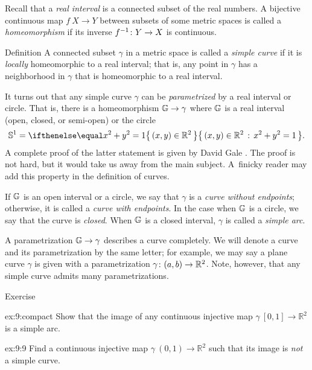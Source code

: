 Recall that a \emph{real interval} is a connected subset of the real numbers.
A bijective continuous map $f\:X\to Y$ between subsets of some metric spaces is called a {}\emph{homeomorphism} if its inverse $f^{-1}\:Y\z\to X$ is continuous.  

\begin{thm}{Definition} 
A connected subset $\gamma$ in a metric space is called a \emph{simple curve} if it is \emph{locally} homeomorphic to a real interval;
that is, any point in $\gamma$ has a neighborhood in $\gamma$ that is homeomorphic to a real interval.
\end{thm}

It turns out that any simple curve $\gamma$ can be \emph{parametrized} by a real interval or circle.
That is, there is a homeomorphism $\mathbb{G}\to\gamma$ 
where $\mathbb{G}$ is a real interval (open, closed, or semi-open) or the circle
\[\mathbb{S}^1=\set{(x,y)\in\mathbb{R}^2}{x^2+y^2=1}.\] 
A complete proof of the latter statement is given by David Gale \cite{gale}.
The proof is not hard, but it would take us away from the main subject.
A~finicky reader may add this property in the definition of curves.

If $\mathbb{G}$ is an open interval or a circle, we say that $\gamma$ is a \emph{curve without endpoints}; otherwise, it is 
called a {}\emph{curve with endpoints}.
In the case when $\mathbb{G}$ is a circle, we say that the curve is \emph{closed}. 
When $\mathbb{G}$ is a closed interval, $\gamma$ is called a {}\emph{simple arc}.


A parametrization $\mathbb{G}\to\gamma$ describes a curve completely.
We will denote a curve and its parametrization by the same letter;
for example, we may say a plane curve $\gamma$ is given with a parametrization $\gamma\:(a,b)\z\to \mathbb{R}^2$.
Note, however, that any simple curve admits many parametrizations. 

\begin{thm}{Exercise}\label{ex:9}

\begin{subthm}{ex:9:compact}
Show that the image of any continuous injective map $\gamma\:[0,1]\to\mathbb{R}^2$ is a simple arc.
\end{subthm}

\begin{subthm}{ex:9:9}
Find a continuous injective map $\gamma\:(0,1)\to\mathbb{R}^2$ such that its image is \textit{not} a simple curve.
\end{subthm}

\end{thm}


